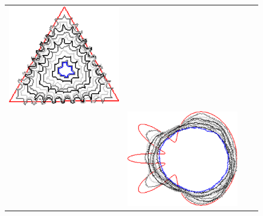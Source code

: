 \begin{figure}
\begin{tabular}{p{2.5em}ccc}
\includegraphics[scale=0.24]{figures/chapter6/radius-effect/triangle/improve/len_pen0/radius-9/summary.pdf} \\[2em]
& \includegraphics[scale=0.24]{figures/chapter6/radius-effect/flower/improve/len_pen0/radius-3/summary.pdf} &

\end{tabular}
\end{figure}
